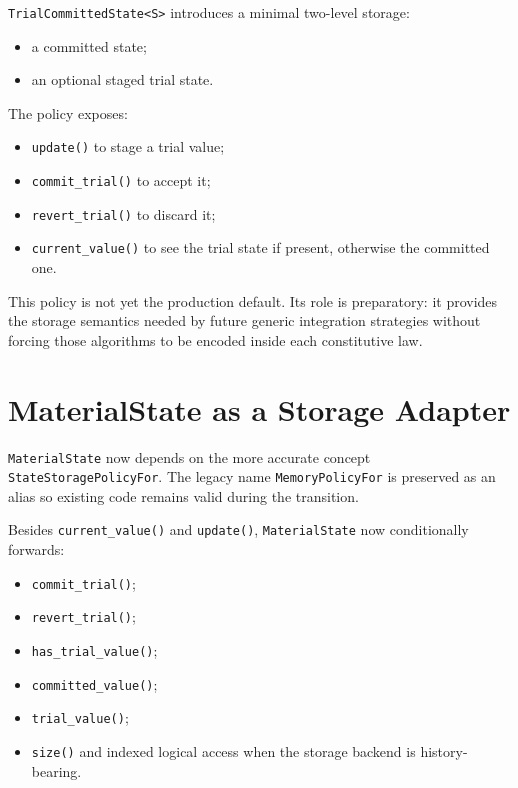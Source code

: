 \texttt{TrialCommittedState<S>} introduces a minimal two-level storage:

\begin{itemize}
  \item a committed state;
  \item an optional staged trial state.
\end{itemize}

The policy exposes:

\begin{itemize}
  \item \texttt{update()} to stage a trial value;
  \item \texttt{commit\_trial()} to accept it;
  \item \texttt{revert\_trial()} to discard it;
  \item \texttt{current\_value()} to see the trial state if present, otherwise
        the committed one.
\end{itemize}

This policy is not yet the production default.  Its role is preparatory: it
provides the storage semantics needed by future generic integration strategies
without forcing those algorithms to be encoded inside each constitutive law.

\section{MaterialState as a Storage Adapter}

\texttt{MaterialState} now depends on the more accurate concept
\texttt{StateStoragePolicyFor}.  The legacy name
\texttt{MemoryPolicyFor} is preserved as an alias so existing code remains
valid during the transition.

Besides \texttt{current\_value()} and \texttt{update()}, \texttt{MaterialState}
now conditionally forwards:

\begin{itemize}
  \item \texttt{commit\_trial()};
  \item \texttt{revert\_trial()};
  \item \texttt{has\_trial\_value()};
  \item \texttt{committed\_value()};
  \item \texttt{trial\_value()};
  \item \texttt{size()} and indexed logical access when the storage backend
        is history-bearing.
\end{itemize}

